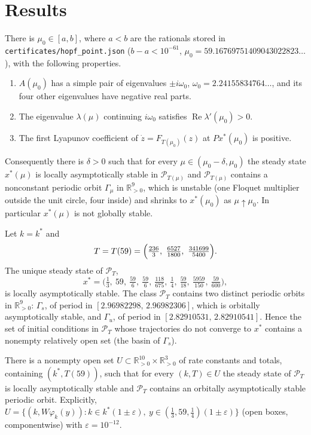 \documentclass[11pt,a4paper]{report}
\begin{document}
\section{Results}
\begin{theorem}\label{thm:hopf}
There is $\mu_0\in[a,b]$, where $a<b$ are the rationals stored in \texttt{certificates/hopf\_point.json} ($b-a<10^{-61}$, $\mu_0=59.16769751409043022823\ldots$), with the following properties.
\begin{enumerate}
\item $A(\mu_0)$ has a simple pair of eigenvalues $\pm i\omega_0$, $\omega_0=2.24155834764\ldots$, and its four other eigenvalues have negative real parts.
\item The eigenvalue $\lambda(\mu)$ continuing $i\omega_0$ satisfies $\operatorname{Re}\lambda'(\mu_0)>0$.
\item The first Lyapunov coefficient of $\dot z=F_{T(\mu_0)}(z)$ at $Px^*(\mu_0)$ is positive.
\end{enumerate}
Consequently there is $\delta>0$ such that for every $\mu\in(\mu_0-\delta,\mu_0)$ the steady state $x^*(\mu)$ is locally asymptotically stable in $\mathcal P_{T(\mu)}$ and $\mathcal P_{T(\mu)}$ contains a nonconstant periodic orbit $\Gamma_\mu$ in $\mathbb R^9_{>0}$, which is unstable (one Floquet multiplier outside the unit circle, four inside) and shrinks to $x^*(\mu_0)$ as $\mu\uparrow\mu_0$. In particular $x^*(\mu)$ is not globally stable.
\end{theorem}

\begin{theorem}\label{thm:explicit}
Let $k=k^*$ and \[T=T(59)=\Bigl(\tfrac{236}{3},\ \tfrac{6527}{1800},\ \tfrac{341699}{5400}\Bigr).\] The unique steady state of $\mathcal P_T$,
\[
x^*=\bigl(\tfrac13,\ 59,\ \tfrac{59}{6},\ \tfrac{59}{6},\ \tfrac{118}{675},\ \tfrac14,\ \tfrac{59}{18},\ \tfrac{5959}{150},\ \tfrac{59}{600}\bigr),
\]
is locally asymptotically stable. The class $\mathcal P_T$ contains two distinct periodic orbits in $\mathbb R^9_{>0}$: $\Gamma_s$, of period in $[2.96982298,\,2.96982306]$, which is orbitally asymptotically stable, and $\Gamma_u$, of period in $[2.82910531,\,2.82910541]$. Hence the set of initial conditions in $\mathcal P_T$ whose trajectories do not converge to $x^*$ contains a nonempty relatively open set (the basin of $\Gamma_s$).
\end{theorem}

\begin{theorem}[robustness]\label{thm:open}
There is a nonempty open set $U\subset\mathbb R^{10}_{>0}\times\mathbb R^3_{>0}$ of rate constants and totals, containing $(k^*,T(59))$, such that for every $(k,T)\in U$ the steady state of $\mathcal P_T$ is locally asymptotically stable and $\mathcal P_T$ contains an orbitally asymptotically stable periodic orbit. Explicitly, $U=\{(k,W\varphi_k(y)):k\in k^*(1\pm\varepsilon),\ y\in(\tfrac13,59,\tfrac14)(1\pm\varepsilon)\}$ (open boxes, componentwise) with $\varepsilon=10^{-12}$.
\end{theorem}
\end{document}
